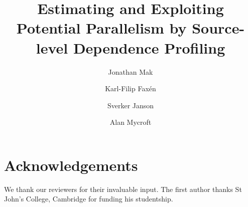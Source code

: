 \documentclass{llncs}
\begin{document}
\pagestyle{plain}

\title{Estimating and Exploiting Potential Parallelism by Source-level Dependence Profiling}

\author{Jonathan Mak
   \and Karl-Filip Fax\'en
   \and Sverker Janson
   \and Alan Mycroft
}

          
\maketitle 





\section*{Acknowledgements}

We thank our reviewers for their invaluable input. The first author thanks St John's College, Cambridge for funding his studentship.


{}
\end{document}
